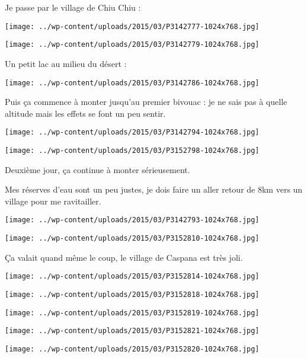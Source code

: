 \pagebreak
Je passe par le village de Chiu Chiu :
\begin{center} \texttt{[image: ../wp-content/uploads/2015/03/P3142777-1024x768.jpg]} \end{center}
\begin{center} \texttt{[image: ../wp-content/uploads/2015/03/P3142779-1024x768.jpg]} \end{center}

\pagebreak
Un petit lac au milieu du désert :
\begin{center} \texttt{[image: ../wp-content/uploads/2015/03/P3142786-1024x768.jpg]} \end{center}

Puis ça commence à monter jusqu'au premier bivouac : je ne sais pas à quelle altitude mais les effets se font un peu sentir.
\begin{center} \texttt{[image: ../wp-content/uploads/2015/03/P3142794-1024x768.jpg]} \end{center}
\begin{center} \texttt{[image: ../wp-content/uploads/2015/03/P3152798-1024x768.jpg]} \end{center}

 Deuxième jour, ça continue à monter sérieusement.

 Mes réserves d'eau sont un peu justes, je dois faire un aller retour de 8km vers un village pour me ravitailler. 
\begin{center} \texttt{[image: ../wp-content/uploads/2015/03/P3142793-1024x768.jpg]} \end{center}
\begin{center} \texttt{[image: ../wp-content/uploads/2015/03/P3152810-1024x768.jpg]} \end{center}

 Ça valait quand même le coup, le village de Caspana est très joli.
\begin{center} \texttt{[image: ../wp-content/uploads/2015/03/P3152814-1024x768.jpg]} \end{center}
\begin{center} \texttt{[image: ../wp-content/uploads/2015/03/P3152818-1024x768.jpg]} \end{center}
\begin{center} \texttt{[image: ../wp-content/uploads/2015/03/P3152819-1024x768.jpg]} \end{center}
\begin{center} \texttt{[image: ../wp-content/uploads/2015/03/P3152821-1024x768.jpg]} \end{center}
\begin{center} \texttt{[image: ../wp-content/uploads/2015/03/P3152820-1024x768.jpg]} \end{center}

